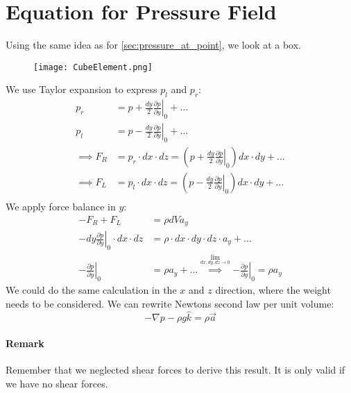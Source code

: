 \section{Equation for Pressure Field}
Using the same idea as for \ref{sec:pressure_at_point}, we look at a box.
\begin{figure}[H]
	\centering
	\texttt{[image: CubeElement.png]}
\end{figure}
We use Taylor expansion to express $p_l$ and $p_r$:
\begin{equation*}
	\begin{split}
		p_r &= p + \left.\frac{dy}{2}\frac{\partial p}{\partial y}\right|_0+\dots\\
		p_l &= p - \left.\frac{dy}{2}\frac{\partial p}{\partial y}\right|_0+\dots\\
		\implies F_R &= p_r\cdot dx\cdot dz = \left( p + \left. \frac{dy}{2}\frac{\partial p}{\partial y}\right|_0\right)dx\cdot dy+\dots\\
		\implies F_L &= p_l\cdot dx\cdot dz = \left( p - \left. \frac{dy}{2}\frac{\partial p}{\partial y}\right|_0\right)dx\cdot dy+\dots\\
	\end{split}
\end{equation*}
We apply force balance in $y$:
\begin{equation*}
	\begin{split}
		-F_R+F_L&=\rho dVa_y\\
		\left.-dy\frac{\partial p}{\partial y}\right|_0\cdot dx\cdot dz &= \rho\cdot dx\cdot dy\cdot dz\cdot a_y+\dots \\
		-\left.\frac{\partial p}{\partial y}\right|_0&=\rho a_y+\dots
		\stackrel{\lim_{dx,dy,dz\to 0 }}{\implies}\left.-\frac{\partial p}{\partial y}\right|_0=\rho a_y
	\end{split}
\end{equation*}
We could do the same calculation in the $x$ and $z$ direction, where the weight needs to be considered. We can rewrite Newtons second law per unit volume:
\begin{equation}
	\boxed{-\nabla p -\rho g\hat k =\rho \vec a}
	\label{eq:newtons_second_law_per_unit_volume}
\end{equation}
\paragraph{Remark} Remember that we neglected shear forces to derive this result. It is only valid if we have no shear forces.

